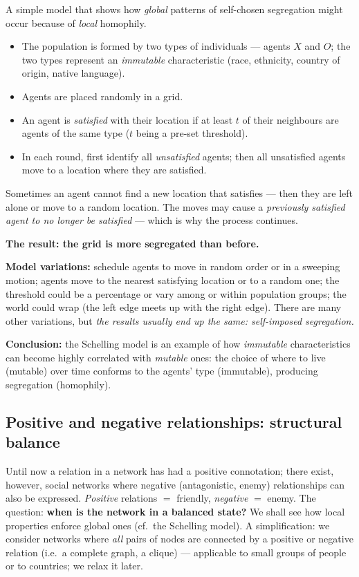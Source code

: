 \documentclass[11pt,a4paper]{article}
\theoremstyle{definition}
\begin{document}
\begin{defbox}
A simple model that shows how \emph{global} patterns of self-chosen segregation might occur because of
\emph{local} homophily.
\begin{itemize}
\item The population is formed by two types of individuals --- agents $X$ and $O$; the two types
      represent an \emph{immutable} characteristic (race, ethnicity, country of origin, native
      language).
\item Agents are placed randomly in a grid.
\item An agent is \emph{satisfied} with their location if at least $t$ of their neighbours are agents
      of the same type ($t$ being a pre-set threshold).
\item In each round, first identify all \emph{unsatisfied} agents; then all unsatisfied agents move to
      a location where they are satisfied.
\end{itemize}
Sometimes an agent cannot find a new location that satisfies --- then they are left alone or move to a
random location. The moves may cause a \emph{previously satisfied agent to no longer be satisfied} ---
which is why the process continues.

\textbf{The result: the grid is more segregated than before.}

\textbf{Model variations:} schedule agents to move in random order or in a sweeping motion; agents
move to the nearest satisfying location or to a random one; the threshold could be a percentage or
vary among or within population groups; the world could wrap (the left edge meets up with the right
edge). There are many other variations, but \emph{the results usually end up the same:
self-imposed segregation.}

\textbf{Conclusion:} the Schelling model is an example of how \emph{immutable} characteristics can
become highly correlated with \emph{mutable} ones: the choice of where to live (mutable) over time
conforms to the agents' type (immutable), producing segregation (homophily).
\end{defbox}

\subsection{Positive and negative relationships: structural balance}

Until now a relation in a network has had a positive connotation; there exist, however, social
networks where negative (antagonistic, enemy) relationships can also be expressed. \emph{Positive}
relations $=$ friendly, \emph{negative} $=$ enemy. The question: \textbf{when is the network in a
balanced state?} We shall see how local properties enforce global ones (cf.\ the Schelling model). A
simplification: we consider networks where \emph{all} pairs of nodes are connected by a positive or
negative relation (i.e.\ a complete graph, a clique) --- applicable to small groups of people or to
countries; we relax it later.
\end{document}
